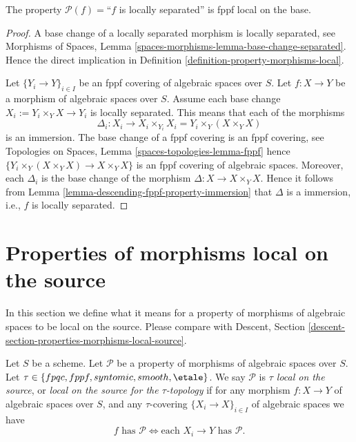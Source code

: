 \begin{lemma}
\label{lemma-descending-fppf-property-locally-separated}
The property $\mathcal{P}(f) =$``$f$ is locally separated''
is fppf local on the base.
\end{lemma}

\begin{proof}
A base change of a locally separated morphism is locally separated, see
Morphisms of Spaces,
Lemma \ref{spaces-morphisms-lemma-base-change-separated}.
Hence the direct implication in
Definition \ref{definition-property-morphisms-local}.

\medskip\noindent
Let $\{Y_i \to Y\}_{i \in I}$ be an fppf covering of algebraic spaces over $S$.
Let $f : X \to Y$ be a morphism of algebraic spaces over $S$.
Assume each base change $X_i := Y_i \times_Y X \to Y_i$ is locally separated.
This means that each of the morphisms
$$
\Delta_i :
X_i
\longrightarrow
X_i \times_{Y_i} X_i = Y_i \times_Y (X \times_Y X)
$$
is an immersion. The base change of a fppf covering is an
fppf covering, see
Topologies on Spaces, Lemma \ref{spaces-topologies-lemma-fppf}
hence $\{Y_i \times_Y (X \times_Y X) \to X \times_Y X\}$
is an fppf covering of algebraic spaces. Moreover, each
$\Delta_i$ is the base change of the morphism
$\Delta : X \to X \times_Y X$. Hence it follows from
Lemma \ref{lemma-descending-fppf-property-immersion}
that $\Delta$ is a immersion, i.e., $f$ is locally separated.
\end{proof}


















\section{Properties of morphisms local on the source}
\label{section-properties-morphisms-local-source}

\noindent
In this section we define what it means for a property of morphisms of
algebraic spaces to be local on the source. Please compare with
Descent, Section \ref{descent-section-properties-morphisms-local-source}.

\begin{definition}
\label{definition-property-morphisms-local-source}
Let $S$ be a scheme.
Let $\mathcal{P}$ be a property of morphisms of algebraic spaces over $S$.
Let $\tau \in \{fpqc, \linebreak[0] fppf, \linebreak[0] syntomic, \linebreak[0]
smooth, \linebreak[0] \etale\}$. We say $\mathcal{P}$ is
{\it $\tau$ local on the source}, or
{\it local on the source for the $\tau$-topology} if for
any morphism $f : X \to Y$ of algebraic spaces over $S$, and any
$\tau$-covering $\{X_i \to X\}_{i \in I}$ of algebraic spaces we have
$$
f \text{ has }\mathcal{P}
\Leftrightarrow
\text{each }X_i \to Y\text{ has }\mathcal{P}.
$$
\end{definition}

